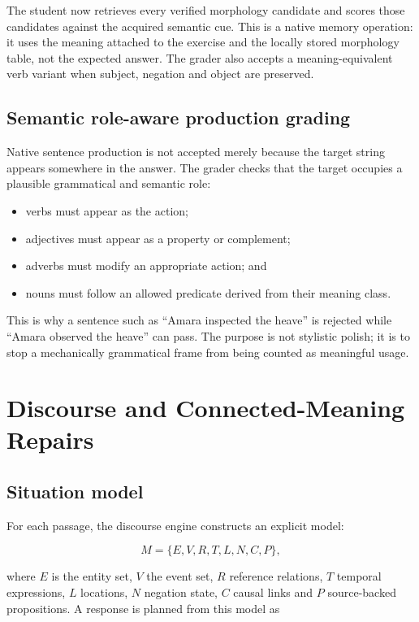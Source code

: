 \documentclass[11pt,a4paper]{article}
\begin{document}
The student now retrieves every verified morphology candidate and scores those candidates against
the acquired semantic cue. This is a native memory operation: it uses the meaning attached to the
exercise and the locally stored morphology table, not the expected answer. The grader also accepts
a meaning-equivalent verb variant when subject, negation and object are preserved.

\subsection{Semantic role-aware production grading}

Native sentence production is not accepted merely because the target string appears somewhere in
the answer. The grader checks that the target occupies a plausible grammatical and semantic role:

\begin{itemize}
  \item verbs must appear as the action;
  \item adjectives must appear as a property or complement;
  \item adverbs must modify an appropriate action; and
  \item nouns must follow an allowed predicate derived from their meaning class.
\end{itemize}

This is why a sentence such as ``Amara inspected the heave'' is rejected while ``Amara observed
the heave'' can pass. The purpose is not stylistic polish; it is to stop a mechanically grammatical
frame from being counted as meaningful usage.

\section{Discourse and Connected-Meaning Repairs}

\subsection{Situation model}

For each passage, the discourse engine constructs an explicit model:

\begin{equation}
M = \{E, V, R, T, L, N, C, P\},
\end{equation}

where $E$ is the entity set, $V$ the event set, $R$ reference relations, $T$ temporal
expressions, $L$ locations, $N$ negation state, $C$ causal links and $P$ source-backed
propositions. A response is planned from this model as
\end{document}

